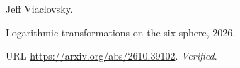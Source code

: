 Jeff Viaclovsky.

\newblock Logarithmic transformations on the six-sphere, 2026{}.

\newblock URL \url{https://arxiv.org/abs/2610.39102}.
\newblock \emph{Verified}.

